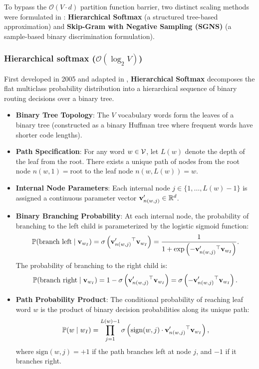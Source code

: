 \documentclass[../../main.tex]{subfiles}
\begin{document}
To bypass the $\mathcal{O}(V \cdot d)$ partition function barrier, two distinct scaling methods were formulated in \cite{mikolov2013distributed}: \textbf{Hierarchical Softmax} (a structured tree-based approximation) and \textbf{Skip-Gram with Negative Sampling (SGNS)} (a sample-based binary discrimination formulation).

\subsubsection{Hierarchical softmax (\texorpdfstring{$\mathcal{O}(\log_2 V)$}{O(log2 V)})}
\label{subsec:hierarchical_softmax}

First developed in 2005 \cite{morin2005hierarchical} and adapted in \cite{mikolov2013distributed}, \textbf{Hierarchical Softmax} decomposes the flat multiclass probability distribution into a hierarchical sequence of binary routing decisions over a binary tree.

\begin{itemize}
    \item \textbf{Binary Tree Topology}: The $V$ vocabulary words form the leaves of a binary tree (constructed as a binary Huffman tree where frequent words have shorter code lengths).
    \item \textbf{Path Specification}: For any word $w \in \mathcal{V}$, let $L(w)$ denote the depth of the leaf from the root. There exists a unique path of nodes from the root node $n(w, 1) = \text{root}$ to the leaf node $n(w, L(w)) = w$.
    \item \textbf{Internal Node Parameters}: Each internal node $j \in \{1, \dots, L(w)-1\}$ is assigned a continuous parameter vector $\mathbf{v}'_{n(w, j)} \in \mathbb{R}^d$.
    \item \textbf{Binary Branching Probability}: At each internal node, the probability of branching to the left child is parameterized by the logistic sigmoid function:
    \begin{equation}
    \label{eq:hierarchical_branch}
    \mathbb{P}(\text{branch left} \mid \mathbf{v}_{w_I}) = \sigma\left( \mathbf{v}'_{n(w, j)}{}^\top \mathbf{v}_{w_I} \right) = \frac{1}{1 + \exp\left( -\mathbf{v}'_{n(w, j)}{}^\top \mathbf{v}_{w_I} \right)}.
    \end{equation}
    The probability of branching to the right child is:
    \begin{equation}
    \label{eq:hierarchical_right}
    \mathbb{P}(\text{branch right} \mid \mathbf{v}_{w_I}) = 1 - \sigma\left( \mathbf{v}'_{n(w, j)}{}^\top \mathbf{v}_{w_I} \right) = \sigma\left( -\mathbf{v}'_{n(w, j)}{}^\top \mathbf{v}_{w_I} \right).
    \end{equation}
    \item \textbf{Path Probability Product}: The conditional probability of reaching leaf word $w$ is the product of binary decision probabilities along its unique path:
    \begin{equation}
    \label{eq:hierarchical_softmax}
    \mathbb{P}(w \mid w_I) = \prod_{j=1}^{L(w)-1} \sigma\left( \text{sign}(w, j) \cdot \mathbf{v}'_{n(w, j)}{}^\top \mathbf{v}_{w_I} \right),
    \end{equation}
    where $\text{sign}(w, j) = +1$ if the path branches left at node $j$, and $-1$ if it branches right.
\end{itemize}
\end{document}
